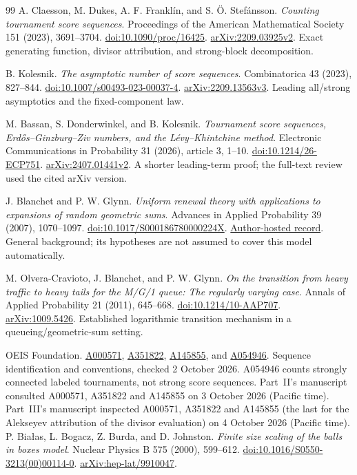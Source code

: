 \documentclass[11pt]{article}
\theoremstyle{remark}\newtheorem{remark}[theorem]{Remark}
\theoremstyle{definition}\newtheorem{definition}[theorem]{Definition}
\begin{document}
\begingroup
\small\raggedright
\begin{thebibliography}{99}
\setlength{\itemsep}{3pt}
A. Claesson, M. Dukes, A. F. Frankl\'in, and S. \"O. Stef\'ansson.
\emph{Counting tournament score sequences}.
Proceedings of the American Mathematical Society 151 (2023), 3691--3704.
\href{https://doi.org/10.1090/proc/16425}{doi:10.1090/proc/16425}.
\href{https://arxiv.org/html/2209.03925v2}{arXiv:2209.03925v2}.
Exact generating function, divisor attribution, and strong-block decomposition.

B. Kolesnik.
\emph{The asymptotic number of score sequences}.
Combinatorica 43 (2023), 827--844.
\href{https://doi.org/10.1007/s00493-023-00037-4}{doi:10.1007/s00493-023-00037-4}.
\href{https://arxiv.org/html/2209.13563v3}{arXiv:2209.13563v3}.
Leading all/strong asymptotics and the fixed-component law.

M. Bassan, S. Donderwinkel, and B. Kolesnik.
\emph{Tournament score sequences, Erd\H{o}s--Ginzburg--Ziv numbers, and the L\'evy--Khintchine method}.
Electronic Communications in Probability 31 (2026), article 3, 1--10.
\href{https://doi.org/10.1214/26-ECP751}{doi:10.1214/26-ECP751}.
\href{https://arxiv.org/html/2407.01441v2}{arXiv:2407.01441v2}.
A shorter leading-term proof; the full-text review used the cited arXiv version.

J. Blanchet and P. W. Glynn.
\emph{Uniform renewal theory with applications to expansions of random geometric sums}.
Advances in Applied Probability 39 (2007), 1070--1097.
\href{https://doi.org/10.1017/S000186780000224X}{doi:10.1017/S000186780000224X}.
\href{https://web.stanford.edu/~glynn/papers/2007/BlanchetG07.html}{Author-hosted record}.
General background; its hypotheses are not assumed to cover this model automatically.

M. Olvera-Cravioto, J. Blanchet, and P. W. Glynn.
\emph{On the transition from heavy traffic to heavy tails for the M/G/1 queue: The regularly varying case}.
Annals of Applied Probability 21 (2011), 645--668.
\href{https://doi.org/10.1214/10-AAP707}{doi:10.1214/10-AAP707}.
\href{https://arxiv.org/abs/1009.5426}{arXiv:1009.5426}.
Established logarithmic transition mechanism in a queueing/geometric-sum setting.

OEIS Foundation.
\href{https://oeis.org/A000571}{A000571},
\href{https://oeis.org/A351822}{A351822},
\href{https://oeis.org/A145855}{A145855}, and
\href{https://oeis.org/A054946}{A054946}.
Sequence identification and conventions, checked 2 October 2026.
A054946 counts strongly connected labeled tournaments, not strong score sequences.
Part~II's manuscript consulted A000571, A351822 and A145855 on 3 October 2026 (Pacific time).
Part~III's manuscript inspected A000571, A351822 and A145855 (the last for the Alekseyev attribution of the divisor evaluation) on 4 October 2026 (Pacific time).
P. Bia\l as, L. Bogacz, Z. Burda, and D. Johnston.
\emph{Finite size scaling of the balls in boxes model}.
Nuclear Physics B 575 (2000), 599--612.
\href{https://doi.org/10.1016/S0550-3213(00)00114-0}{doi:10.1016/S0550-3213(00)00114-0}.
\href{https://arxiv.org/abs/hep-lat/9910047}{arXiv:hep-lat/9910047}.


\end{thebibliography}
\end{document}
